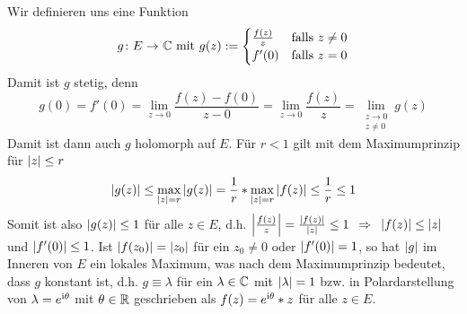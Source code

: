 \begin{exercisePage}
	Wir definieren uns eine Funktion 
	\begin{equation*}
		\abb{g}{E}{\CC} \mit g(z) \defeq \begin{cases}
		\frac{f(z)}{z} & \text{falls } z \neq 0 \\
		f'(0)		   & \text{falls } z = 0
		\end{cases}
	\end{equation*}
	Damit ist $g$ stetig, denn
	\begin{equation*}
		g(0) = f'(0) = \lim_{z \to 0} \frac{f(z) - f(0)}{z - 0} = \lim_{z \to 0} \frac{f(z)}{z} = \lim_{\substack{z \to 0 \\ z \neq 0}} g(z)
	\end{equation*}
	Damit ist dann auch $g$ holomorph auf $E$. Für $r < 1$ gilt mit dem Maximumprinzip für $\left| z \right| \le r$ 
	\begin{equation*}
		\left| g(z) \right| \le \max_{\left| z \right| = r} \left| g(z) \right| = \frac{1}{r} * \max_{\left| z \right| = r} \left| f(z) \right| \le \frac{1}{r} \le 1
	\end{equation*}
	Somit ist also $\left| g(z) \right| \le 1$ für alle $z \in E$, d.h. $\left| \frac{f(z)}{z} \right| = \frac{\left| f(z) \right|}{\left| z \right|} \le 1 \enskip \Rightarrow \enskip \left| f(z) \right| \le \left| z \right|$ und $\left| f'(0) \right| \le 1$.
	Ist $\left| f(z_0) \right| = \left| z_0 \right|$ für ein $z_0 \neq 0$ oder $\left| f'(0) \right| = 1$, so hat $\left| g \right|$ im Inneren von $E$ ein lokales Maximum, was nach dem Maximumprinzip bedeutet, dass $g$ konstant ist, d.h. $g \equiv \lambda$ für ein $\lambda \in \mathbb{C}$ mit $\left| \lambda \right| = 1$ bzw. in Polardarstellung von $\lambda = e^{\mathrm{i} \theta}$ mit $\theta \in \mathbb{R}$ geschrieben als $f(z) = e^{\mathrm{i} \theta} * z$ für alle $z \in E$.
\end{exercisePage}